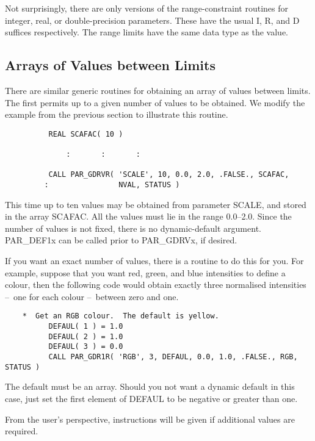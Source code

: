 \documentclass[twoside,11pt]{article}
\newcommand{\xlabel}[1]{}
\newcommand{\dash}{--}
\newcommand{\dash}{-}
\begin{document}
Not surprisingly, there are only versions of the range-constraint
routines for integer, real, or double-precision parameters.   These have
the usual I, R, and D suffices respectively.  The range limits have the
same data type as the value.

\subsection{\xlabel{arrays_of_values_between_limits}Arrays of Values between Limits}
\label{se:avl}

There are similar generic routines for obtaining an array of values
between limits.  The first permits up to a given number of values to be
obtained.  We modify the example from the previous section to illustrate
this routine. 

\begin{verbatim}
          REAL SCAFAC( 10 )
 
              :       :       :

          CALL PAR_GDRVR( 'SCALE', 10, 0.0, 2.0, .FALSE., SCAFAC,
         :                NVAL, STATUS )
\end{verbatim}

This time up to ten values may be obtained from parameter SCALE, and
stored in the array SCAFAC.  All the values must lie in the range
0.0\dash2.0.  Since the number of values is not fixed, there is no
dynamic-default argument.  PAR\_DEF1x can be called prior to PAR\_GDRVx,
if desired. 

If you want an exact number of values, there is a routine to do this
for you.  For example, suppose that you want red, green, and blue
intensities to define a colour, then the following code would obtain
exactly three normalised intensities \dash\ one for each colour \dash\ between
zero and one.

\begin{verbatim}
    *  Get an RGB colour.  The default is yellow.
          DEFAUL( 1 ) = 1.0
          DEFAUL( 2 ) = 1.0
          DEFAUL( 3 ) = 0.0
          CALL PAR_GDR1R( 'RGB', 3, DEFAUL, 0.0, 1.0, .FALSE., RGB, STATUS )
\end{verbatim}

The default must be an array.  Should you not want a dynamic default in
this case, just set the first element of DEFAUL to be negative or
greater than one. 

From the user's perspective, instructions will be given if additional
values are required.
\end{document}
